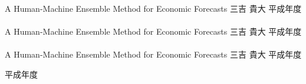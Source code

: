 \documentclass{tarticle}
\begin{document}
\Large
\noindent
A Human-Machine Ensemble Method for Economic Forecasts
\qquad\qquad\quad
三吉 貴大
\qquad
平成年度
\\
\\
A Human-Machine Ensemble Method for Economic Forecasts
\qquad\qquad\quad
三吉 貴大
\qquad
平成年度
\\
\\
A Human-Machine Ensemble Method for Economic Forecasts
\qquad\qquad\quad
三吉 貴大
\qquad
平成年度
\\
\begin{flushright}
平成年度
\end{flushright}
\end{document}
